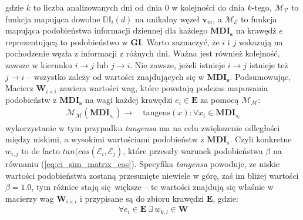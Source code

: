 gdzie $k$ to liczba analizowanych dni od dnia $0$ w kolejności do dnia $k$-tego, $\mathcal{M_{V}}$
to funkcja mapująca dowolne $\mathbb{DI}_{i}(d)$ na unikalny węzeł $\mathbf{v}_{m}$, 
a $\mathcal{M_{E}}$ to funkcja mapująca podobieństwa informacji dziennej dla każdego 
$\mathbf{MDI_s}$ na krawędź $e$ reprezentującą to podobieństwo w $\mathbf{GI}$.
Warto zaznaczyć, że $i$ i $j$ wskazują na pochodzenie węzła z informacji z różnych dni.
Ważna jest również kolejność, zawsze w kierunku $i \xrightarrow{} j$ lub $j \xrightarrow{} i$.
Nie zawsze, jeżeli istnieje $i \xrightarrow{} j$ istnieje też $j \xrightarrow{} i$ -- 
wszystko zależy od wartości znajdujących się w $\mathbf{MDI_s}$. Podsumowując, Macierz 
$\mathbf{W}_{i \times i}$ zawiera wartości wag, które powstają podczas mapowania podobieństw 
z $\mathbf{MDI_s}$ na wagi każdej krawędzi $e_{i} \in \mathbf{E}$ za pomocą $\mathcal{M_{M}}$:
\begin{equation}
    \label{eq:tan_as_separator}
    \begin{aligned}
        \mathcal{M_{M}}(\mathbf{MDI}_{s_{i}}) \xrightarrow[]{} &  
            \: \text{tangens}(x) : \forall x_{i} \in \mathbf{MDI}_{s_{i}}
    \end{aligned}
\end{equation}
wykorzystanie w tym przypadku \textit{tangensa} ma na celu zwiększenie odległości między niskimi, 
a wysokimi wartościami podobieństw z $\mathbf{MDI}_{s}$. Czyli konkretne $w_{i,j}$ to de facto
$tan(cos(\mathcal{E}_i, \mathcal{E}_j)$, które przeszły warunek podobieństwa $\beta$ 
na równaniu (\ref{eq:ci_sim_matrix_cos}). Specyfika \textit{tangensa} powoduje, ze niskie wartości
podobieństwa zostaną przesunięte niewiele w górę, zaś im bliżej wartości $\beta=1.0$,
tym różnice stają się większe -- te wartości znajdują się właśnie w macierzy wag 
$\mathbf{W}_{i \times i}$ i przypisane są do zbioru krawędzi $\mathbf{E}$, gdzie:
\begin{equation}
    \begin{aligned}
        \forall e_{i} \in \mathbf{E} \: \exists \: w_{k, l} \in \mathbf{W}
    \end{aligned}
\end{equation}

